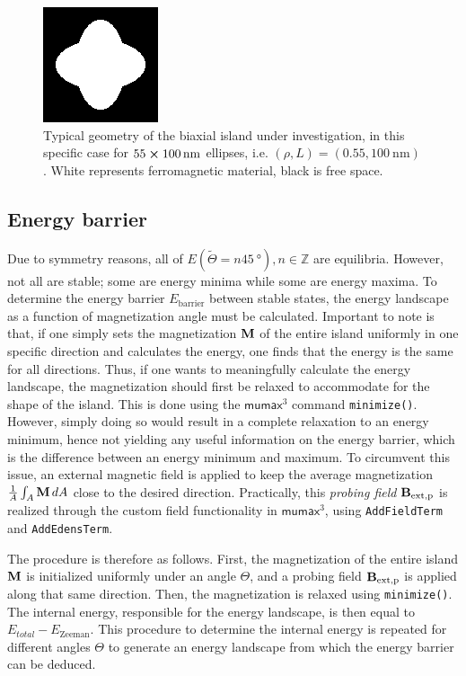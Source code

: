\documentclass[11pt,a4paper,english,twoside]{article}
\newcommand{\code}[1]{\texttt{#1}}
\newcommand{\mumax}{$\mathsf{mumax}^3$}
\begin{document}
\begin{figure}
    \centering
    \includegraphics[width=0.3\columnwidth]{Figures/biaxial_island/Geometry/geomPlus55.png}
    \caption{Typical geometry of the biaxial island under investigation, in this specific case for $55\cross\SI{100}{\nano\metre}$ ellipses, i.e. $(\rho, L)=(0.55, \SI{100}{\nano\metre})$. White represents ferromagnetic material, black is free space.}
    \label{fig:biaxial_island:geometryTypical}
\end{figure}

\subsection{Energy barrier}
\label{par:Biaxial_EnergyBarrier}
Due to symmetry reasons, all of $E(\widetilde{\Theta} = n\SI{45}{\degree}), n\in\mathbb{Z}$ are equilibria. However, not all are stable; some are energy minima while some are energy maxima. To determine the energy barrier $E_\mathrm{barrier}$ between stable states, the energy landscape as a function of magnetization angle must be calculated. Important to note is that, if one simply sets the magnetization $\vb{M}$ of the entire island uniformly in one specific direction and calculates the energy, one finds that the energy is the same for all directions. Thus, if one wants to meaningfully calculate the energy landscape, the magnetization should first be relaxed to accommodate for the shape of the island. This is done using the \mumax{} command \code{minimize()}. However, simply doing so would result in a complete relaxation to an energy minimum, hence not yielding any useful information on the energy barrier, which is the difference between an energy minimum and maximum. To circumvent this issue, an external magnetic field is applied to keep the average magnetization $\frac{1}{A}\int_A \vb{M}\,dA$ close to the desired direction. Practically, this \textit{probing field} $\vb{B_\mathrm{ext,p}}$ is realized through the custom field functionality in \mumax{}, using \code{AddFieldTerm} and \code{AddEdensTerm}. \par
The procedure is therefore as follows. First, the magnetization of the entire island $\vb{M}$ is initialized uniformly under an angle $\Theta$, and a probing field $\vb{B_\mathrm{ext,p}}$ is applied along that same direction. Then, the magnetization is relaxed using \code{minimize()}. The internal energy, responsible for the energy landscape, is then equal to $E_{total} - E_\mathrm{Zeeman}$. This procedure to determine the internal energy is repeated for different angles $\Theta$ to generate an energy landscape from which the energy barrier can be deduced.
\end{document}
